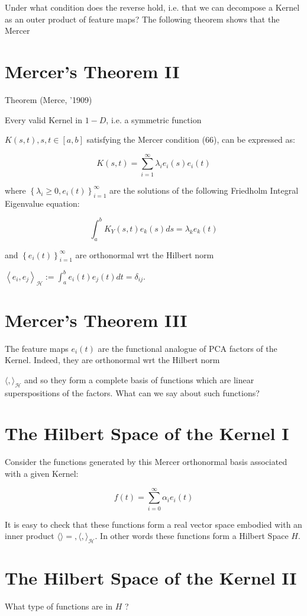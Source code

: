 \documentclass[11pt]{article}
\theoremstyle{plain} %
\theoremstyle{remark}
\begin{document}
Under what condition does the reverse hold, i.e. that we can decompose a Kernel
as an outer product of feature maps? The following theorem shows that the Mercer

\section*{Mercer's Theorem II}
Theorem (Merce, '1909)

Every valid Kernel in $1-D$, i.e. a symmetric function

$K(s, t), s, t \in[a, b]$ satisfying the Mercer condition (66), can be expressed
as:

$$
K(s, t)=\sum_{i=1}^{\infty} \lambda_{i} e_{i}(s) e_{i}(t)
$$

where $\left\{\lambda_{i} \geq 0, e_{i}(t)\right\}_{i=1}^{\infty}$ are the
solutions of the following Friedholm Integral Eigenvalue equation:

$$
\int_{a}^{b} K_{Y}(s, t) e_{k}(s) d s=\lambda_{k} e_{k}(t)
$$

and $\left\{e_{i}(t)\right\}_{i=1}^{\infty}$ are orthonormal wrt the Hilbert
norm

$\left\langle e_{i}, e_{j}\right\rangle_{\mathcal{H}}:=\int_{a}^{b} e_{i}(t)
e_{j}(t) d t=\delta_{i j}$.

\section*{Mercer's Theorem III}
The feature maps $e_{i}(t)$ are the functional analogue of PCA factors of the
Kernel. Indeed, they are orthonormal wrt the Hilbert norm

$\langle,\rangle_{\mathcal{H}}$ and so they form a complete basis of functions
which are linear superspositions of the factors. What can we say about such
functions?

\section*{The Hilbert Space of the Kernel I}
Consider the functions generated by this Mercer orthonormal basis associated
with a given Kernel:

$$
f(t)=\sum_{i=0}^{\infty} \alpha_{i} e_{i}(t)
$$

It is easy to check that these functions form a real vector space embodied with
an inner product $\langle\rangle=,\langle,\rangle_{\mathcal{H}}$. In other words
these functions form a Hilbert Space $H$.

\section*{The Hilbert Space of the Kernel II}
What type of functions are in $H$ ?
\end{document}
